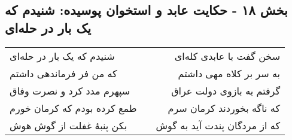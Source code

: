 \begin{center}
\section*{بخش ۱۸ - حکایت عابد و استخوان پوسیده: شنیدم که یک بار در حله‌ای}
\label{sec:018}
\begin{longtable}{l p{0.5cm} r}
شنیدم که یک بار در حله‌ای
&&
سخن گفت با عابدی کله‌ای
\\
که من فر فرماندهی داشتم
&&
به سر بر کلاه مهی داشتم
\\
سپهرم مدد کرد و نصرت وفاق
&&
گرفتم به بازوی دولت عراق
\\
طمع کرده بودم که کرمان خورم
&&
که ناگه بخوردند کرمان سرم
\\
بکن پنبهٔ غفلت از گوش هوش
&&
که از مردگان پندت آید به گوش
\\
\end{longtable}
\end{center}
